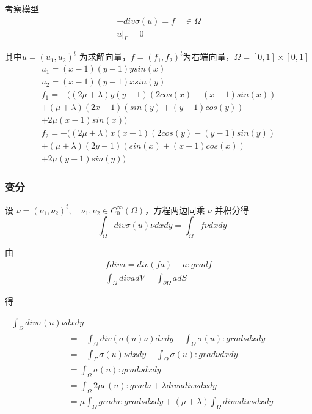 \documentclass[a4paper,UTF8,titlepage]{ctexart}
\begin{document}
考察模型
$$
\begin{matrix}
	-div \sigma(u) = f \quad \in \Omega  \\
	u |_{\Gamma} = 0
\end{matrix}
$$ 
\par
其中$ u = (u_1,u_2)^t $ 为求解向量，$ f = (f_1,f_2)^t $为右端向量，$ \Omega = [0,1] \times [0,1] $
$$
\begin{matrix}
	u_1 = (x - 1)(y - 1) y sin(x) 
	\\
	u_2 = (x - 1)(y - 1) x sin(y) 
	\\
	f_1 = -((2 \mu + \lambda) y (y - 1) (2 cos(x) - (x - 1) sin(x)) \\
	+ (\mu + \lambda) (2 x - 1) (sin(y) + (y - 1) cos(y)) \\
	+ 2 \mu (x - 1) sin(x)) 
	\\
	f_2 = -((2 \mu + \lambda) x (x - 1) (2 cos(y) - (y - 1) sin(y)) \\
	+ (\mu + \lambda) (2 y - 1) (sin(x) + (x - 1) cos(x)) \\ 
	+ 2 \mu (y - 1) sin(y))
\end{matrix}
$$

\subsubsection{变分}

设 $\nu = (\nu_1,\nu_2)^t, \quad \nu_1, \nu_2 \in C_0^{\infty}(\Omega)$，方程两边同乘 $\nu$ 并积分得
$$
-\int_{\Omega} div \sigma(u) \nu dxdy = \int_{\Omega} f \nu dxdy
$$

由
$$
\begin{matrix}
	f div a = div(fa) - a : grad f \\
	\int_{\Omega} div a dV = \int_{\partial \Omega} a dS
\end{matrix}
$$

得
\par \quad \quad
$-\int_{\Omega} div \sigma(u) \nu dxdy$
$$ 
\quad \quad
\begin{matrix}
	\begin{aligned}
		&= -\int_{\Omega} div(\sigma(u) \nu) dxdy - \int_{\Omega} \sigma(u) : grad \nu dxdy \\
		&= -\int_{\Gamma} \sigma(u) \nu dxdy + \int_{\Omega} \sigma(u) : grad \nu dxdy \\
		&= \int_{\Omega} \sigma(u) : grad \nu dxdy \\
		&= \int_{\Omega} 2 \mu \epsilon(u) : grad \nu + \lambda div u div \nu dxdy  \\
		&= \mu \int_{\Omega} grad u : grad \nu dxdy + (\mu +\lambda) \int_{\Omega} div u div \nu  dxdy
	\end{aligned}
\end{matrix}
$$
\end{document}

